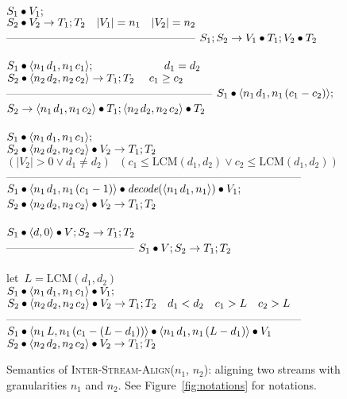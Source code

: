 \renewcommand{\skiptopa}[0]{\vspace{-2pt}\\}
\begin{figure}[t]
$S_1 \bullet V_1;$\skiptopa
$S_2 \bullet V_2 \rightarrow T_1; T_2~~~|V_1| = n_1~~~|V_2| = n_2$\vspace{-1pt}\skiptopa
---------------------------------------------------\skipbot
$S_1; S_2 \rightarrow V_1 \bullet T_1; V_2 \bullet T_2$
~ \\ ~ \\
$S_1 \bullet \langle n_1{\hspace{1.3pt}}d_1, n_1{\hspace{1.3pt}}c_1\rangle;~~~~~~~~~~~~~~~~~~~d_1 = d_2$\skiptopa
$S_2 \bullet \langle n_2{\hspace{1.3pt}}d_2, n_2{\hspace{1.3pt}}c_2\rangle \rightarrow T_1; T_2~~~~c_1 \ge c_2$\vspace{-2pt}\skiptopa
--------------------------------------------------------\skipbot
$S_1 \bullet \langle n_1{\hspace{1.3pt}}d_1, n_1{\hspace{1.3pt}}(c_1-c_2)\rangle;$\\
$S_2 \rightarrow \langle n_1{\hspace{1.3pt}}d_1, n_1{\hspace{1.3pt}}c_2\rangle \bullet T_1; \langle n_2{\hspace{1.3pt}}d_2, n_2{\hspace{1.3pt}}c_2\rangle \bullet T_2$
~ \\ ~ \\
$S_1 \bullet \langle n_1{\hspace{1.3pt}}d_1, n_1{\hspace{1.3pt}}c_1\rangle;~~~~~~~~~~$\skiptopa
$S_2 \bullet \langle n_2{\hspace{1.3pt}}d_2, n_2{\hspace{1.3pt}}c_2\rangle \bullet V_2 \rightarrow T_1; T_2$\vspace{2pt}\\
$(|V_2| > 0 \vee d_1 \ne d_2)~~~(c_1 \le \mbox{LCM}(d_1,d_2) \vee c_2 \le \mbox{LCM}(d_1,d_2))$\vspace{-1pt}\skiptopa
--------------------------------------------------------------------------------\skipbot
$S_1 \bullet \langle n_1{\hspace{1.3pt}}d_1, n_1{\hspace{1.3pt}}(c_1-1)\rangle \bullet \mbox{\it decode}(\langle n_1{\hspace{1.3pt}}d_1, n_1\rangle) \bullet V_1;$\vspace{1pt}\\
$S_2 \bullet \langle n_2{\hspace{1.3pt}}d_2, n_2{\hspace{1.3pt}}c_2\rangle \bullet V_2 \rightarrow T_1; T_2$
~ \\ ~ \\
$S_1 \bullet \langle d, 0\rangle \bullet V; S_2 \rightarrow T_1; T_2$\skiptopa
-----------------------------------\skipbot
$S_1 \bullet V; S_2 \rightarrow T_1; T_2$
~ \\ ~ \\
let~$L=\mbox{LCM}(d_1,d_2)$\vspace{-3pt}\\
$S_1 \bullet \langle n_1{\hspace{1.3pt}}d_1, n_1{\hspace{1.3pt}}c_1\rangle \bullet V_1;$\\
$S_2 \bullet \langle n_2{\hspace{1.3pt}}d_2, n_2{\hspace{1.3pt}}c_2\rangle \bullet V_2 \rightarrow T_1; T_2~~~d_1 < d_2~~~c_1 > L~~~c_2 > L$\vspace{-4pt}\\
--------------------------------------------------------------------------------\skipbot
$S_1 \bullet \langle n_1{\hspace{1.3pt}}L, n_1{\hspace{1.3pt}}(c_1-(L-d_1))\rangle \bullet \langle n_1{\hspace{1.3pt}}d_1, n_1{\hspace{1.3pt}}(L-d_1)\rangle \bullet V_1$\\
$S_2 \bullet \langle n_2{\hspace{1.3pt}}d_2, n_2{\hspace{1.3pt}}c_2\rangle \bullet V_2 \rightarrow T_1; T_2$
\caption{Semantics of \textsc{Inter-Stream-Align}($n_1$, $n_2$):
aligning two streams with granularities $n_1$ and $n_2$.  See Figure~\ref{fig:notations} for notations.
\protect\label{fig:inter-stream-align}}
\end{figure}

